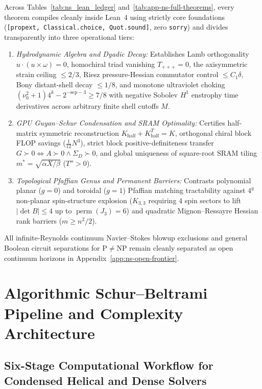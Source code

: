 \documentclass[10pt]{article}
\renewcommand{\_}{\OrigUnderscore\hspace{0pt}}
\numberwithin{equation}{section}
\begin{document}
Across Tables~\ref{tab:ns_lean_ledger} and~\ref{tab:app-ns-full-theorems}, every theorem compiles cleanly inside Lean~4 using strictly core foundations (\texttt{[propext, Classical.choice, Quot.sound]}, zero \texttt{sorry}) and divides transparently into three operational tiers:
\begin{enumerate}
\item \emph{Hydrodynamic Algebra and Dyadic Decay:} Establishes Lamb orthogonality $u\cdot(u\times\omega) = 0$, homochiral triad vanishing $T_{+++} = 0$, the axisymmetric strain ceiling $\le 2/3$, Riesz pressure-Hessian commutator control $\le C_1\delta$, Bony distant-shell decay $\le 1/8$, and monotone ultraviolet choking $(\nu_0^2+1)4^k - 2^{-\mathrm{sep}-3} \ge 7/8$ with negative Sobolev $H^1$ enstrophy time derivatives across arbitrary finite shell cutoffs $M$.
\item \emph{GPU Guyan--Schur Condensation and SRAM Optimality:} Certifies half-matrix symmetric reconstruction $K_{\mathrm{half}} + K_{\mathrm{half}}^T = K$, orthogonal chiral block FLOP savings ($\frac{1}{12}N^3$), strict block positive-definiteness transfer $G \succ 0 \iff A \succ 0 \land \Sigma_D \succ 0$, and global uniqueness of square-root SRAM tiling $m^* = \sqrt{\alpha X/\beta}$ ($T'' > 0$).
\item \emph{Topological Pfaffian Genus and Permanent Barriers:} Contrasts polynomial planar ($g=0$) and toroidal ($g=1$) Pfaffian matching tractability against $4^g$ non-planar spin-structure explosion ($K_{3,3}$ requiring $4$ spin sectors to lift $|\det B| \le 4$ up to $\operatorname{perm}(J_3) = 6$) and quadratic Mignon--Ressayre Hessian rank barriers ($m \ge n^2/2$).
\end{enumerate}
All infinite-Reynolds continuum Navier--Stokes blowup exclusions and general Boolean circuit separations for $\mathrm{P} \neq \mathrm{NP}$ remain cleanly separated as open continuum horizons in Appendix~\ref{app:ns-open-frontier}.

\section{Algorithmic Schur--Beltrami Pipeline and Complexity Architecture}\label{app:ns-algorithm-blueprint}

\subsection{Six-Stage Computational Workflow for Condensed Helical and Dense Solvers}\label{subsec:app-ns-algo-steps}
\end{document}
